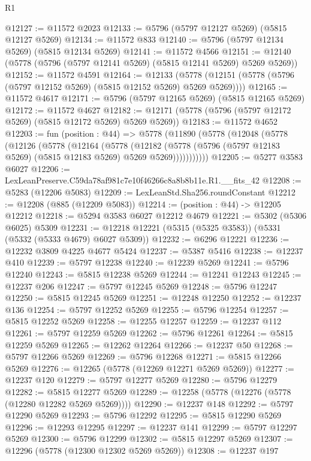 \begin{lexlean}{R1}
\begin{coremodule}
@12127 := @11572 @2023
@12133 := @5796 (@5797 @12127 @5269) (@5815 @12127 @5269)
@12134 := @11572 @833
@12140 := @5796 (@5797 @12134 @5269) (@5815 @12134 @5269)
@12141 := @11572 @4566
@12151 := @12140 (@5778 (@5796 (@5797 @12141 @5269) (@5815 @12141 @5269) @5269 @5269))
@12152 := @11572 @4591
@12164 := @12133
    (@5778 (@12151 (@5778 (@5796 (@5797 @12152 @5269) (@5815 @12152 @5269) @5269 @5269))))
@12165 := @11572 @4617
@12171 := @5796 (@5797 @12165 @5269) (@5815 @12165 @5269)
@12172 := @11572 @4627
@12182 := @12171 (@5778 (@5796 (@5797 @12172 @5269) (@5815 @12172 @5269) @5269 @5269))
@12183 := @11572 @4652
@12203 := fun (position : @44) =>
  @5778
    (@11890
      (@5778
        (@12048
          (@5778
            (@12126
              (@5778
                (@12164
                  (@5778
                    (@12182
                      (@5778 (@5796 (@5797 @12183 @5269) (@5815 @12183 @5269) @5269 @5269)))))))))))
@12205 := @5277 @3583 @6027
@12206 := LexLeanPreserve.C59da78af981c7e10f46266c8a8b8b11e.R1.__fits_42
@12208 := @5283 (@12206 @5083)
@12209 := LexLeanStd.Sha256.roundConstant
@12212 := @12208 (@885 (@12209 @5083))
@12214 := (position : @44) -> @12205 @12212
@12218 := @5294 @3583 @6027 @12212 @4679
@12221 := @5302 (@5306 @6025) @5309
@12231 := @12218 @12221 (@5315 (@5325 @3583)) (@5331 (@5332 (@5333 @4679) @6027 @5309))
@12232 := @6296 @12221
@12236 := @12232 @3809 @4225 @4677 @5424
@12237 := @5387 @5416
@12238 := @12237 @410
@12239 := @5797 @12238
@12240 := @12239 @5269
@12241 := @5796 @12240
@12243 := @5815 @12238 @5269
@12244 := @12241 @12243
@12245 := @12237 @206
@12247 := @5797 @12245 @5269
@12248 := @5796 @12247
@12250 := @5815 @12245 @5269
@12251 := @12248 @12250
@12252 := @12237 @136
@12254 := @5797 @12252 @5269
@12255 := @5796 @12254
@12257 := @5815 @12252 @5269
@12258 := @12255 @12257
@12259 := @12237 @112
@12261 := @5797 @12259 @5269
@12262 := @5796 @12261
@12264 := @5815 @12259 @5269
@12265 := @12262 @12264
@12266 := @12237 @50
@12268 := @5797 @12266 @5269
@12269 := @5796 @12268
@12271 := @5815 @12266 @5269
@12276 := @12265 (@5778 (@12269 @12271 @5269 @5269))
@12277 := @12237 @120
@12279 := @5797 @12277 @5269
@12280 := @5796 @12279
@12282 := @5815 @12277 @5269
@12289 := @12258 (@5778 (@12276 (@5778 (@12280 @12282 @5269 @5269))))
@12290 := @12237 @148
@12292 := @5797 @12290 @5269
@12293 := @5796 @12292
@12295 := @5815 @12290 @5269
@12296 := @12293 @12295
@12297 := @12237 @141
@12299 := @5797 @12297 @5269
@12300 := @5796 @12299
@12302 := @5815 @12297 @5269
@12307 := @12296 (@5778 (@12300 @12302 @5269 @5269))
@12308 := @12237 @197

\end{coremodule}
\end{lexlean}
